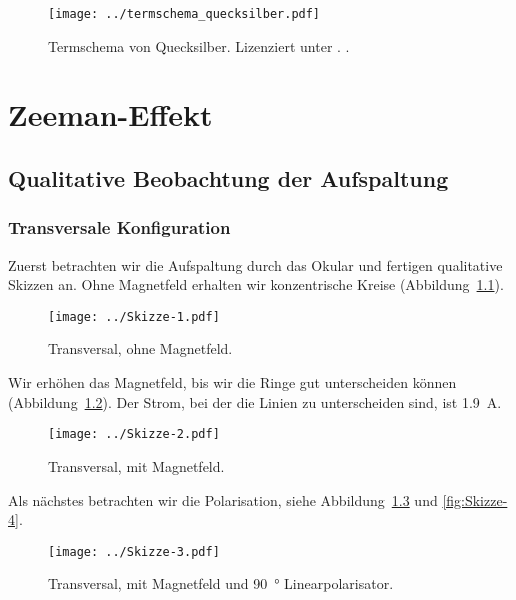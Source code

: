 \begin{figure}[htbp]
    \centering
    \texttt{[image: ../termschema\_quecksilber.pdf]}
    \caption{%
        Termschema von Quecksilber. Lizenziert unter \ccbyncsa.
        \parencite{Kraehling/Termschema_Quecksilber}.
    }
    \label{fig:Termschema}
\end{figure}

\chapter{Zeeman-Effekt}

\section{Qualitative Beobachtung der Aufspaltung}

\subsection{Transversale Konfiguration}

Zuerst betrachten wir die Aufspaltung durch das Okular und fertigen qualitative
Skizzen an. Ohne Magnetfeld erhalten wir konzentrische Kreise
(Abbildung~\ref{fig:Skizze-1}).

\begin{figure}[htbp]
    \centering
    \texttt{[image: ../Skizze-1.pdf]}
    \caption{%
        Transversal, ohne Magnetfeld.
    }
    \label{fig:Skizze-1}
\end{figure}

Wir erhöhen das Magnetfeld, bis wir die Ringe gut unterscheiden können
(Abbildung~\ref{fig:Skizze-2}). Der Strom, bei der die Linien zu unterscheiden
sind, ist \SI{1.9}{\ampere}. 

\begin{figure}[htbp]
    \centering
    \texttt{[image: ../Skizze-2.pdf]}
    \caption{%
        Transversal, mit Magnetfeld.
    }
    \label{fig:Skizze-2}
\end{figure}

Als nächstes betrachten wir die Polarisation, siehe
Abbildung~\ref{fig:Skizze-3} und \ref{fig:Skizze-4}.

\begin{figure}[htbp]
    \centering
    \texttt{[image: ../Skizze-3.pdf]}
    \caption{%
        Transversal, mit Magnetfeld und \SI{90}{\degree} Linearpolarisator.
    }
    \label{fig:Skizze-3}
\end{figure}

